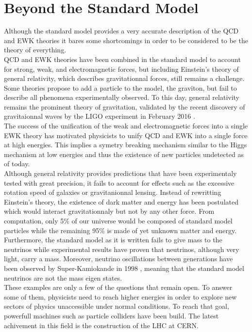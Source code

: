   \section{Beyond the Standard Model}

    Although the standard model provides a very accurate description of the QCD and EWK theories it bares some shortcomings in order to be considered to be the theory of everything. \\

    QCD and EWK theories have been combined in the standard model to account for strong, weak, and electromagnetic forces, but including Einstein's theory of general relativity, which describes gravitationnal forces, still remains a challenge. Some theories propose to add a particle to the model, the graviton, but fail to describe all phenomena experimentally observed. To this day, general relativity remains the prominent theory of gravitation, validated by the recent discovery of gravitaionnal waves by the LIGO experiment in February 2016 \cite{PhysRevLett.116.061102}. \\

    The success of the unification of the weak and electromagnetic forces into a single EWK theory has motivated physicists to unify QCD and EWK into a single force at high energies. This implies a symetry breaking mechanism similar to the Higgs mechanism at low energies and thus the existence of new particles undetected as of today. \\

    Although general relativity provides predictions that have been experimentaly tested with great precision, it fails to account for effects such as the excessive rotation speed of galaxies or gravitanionnal lensing. Instead of rewritting Einstein's theory, the existence of dark matter and energy has been postulated which would interact gravitationnaly but not by any other force. From computation, only 5\% of our universe would be composed of standard model particles while the remaining 95\% is made of yet unknown matter and energy. \\

    Furthermore, the standard model as it is written fails to give mass to the neutrinos while experimental results have proven that neutrinos, although very light, carry a mass. Moreover, neutrino oscillations between generations have been observed by Super-Kamiokande in 1998 \cite{Fukuda:1998mi}, meaning that the standard model neutrinos are not the mass eigen states. \\

    These examples are only a few of the questions that remain open. To answer some of them, physicists need to reach higher energies in order to explore new sectors of physics unaccessible under normal conditions. To reach that goal, powerfull machines such as particle colliders have been build. The latest achivement in this field is the construction of the LHC at CERN.
